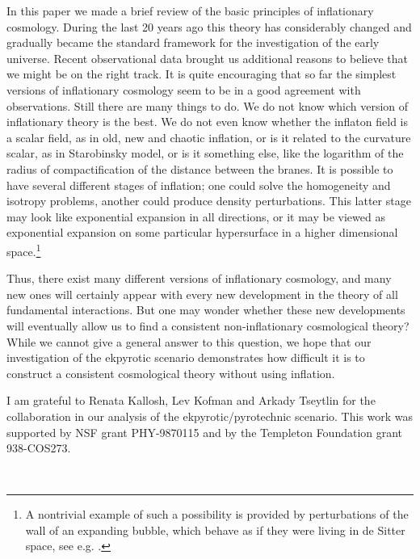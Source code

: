 \documentclass[a4paper,12pt]{article}
\begin{document}
In this paper we made a brief review of the basic principles of inflationary cosmology. During the last 20 years ago this theory has considerably changed and gradually became the standard framework for the investigation of the early universe. Recent observational data brought us additional reasons to believe that we might be on the right track.  It is quite encouraging that so far the simplest versions of inflationary cosmology seem to be in a good agreement with observations. Still there are many things to do. We do not know which  version  of inflationary theory is the best.  We do not even know whether the inflaton field is a scalar field, as in old, new and chaotic inflation, or is it related to the curvature scalar, as in Starobinsky model, or is it something else, like the logarithm of the radius of compactification of the distance between the branes. It is possible to have several different stages of inflation; one could solve the homogeneity and isotropy problems, another could produce density perturbations. This latter stage may look like exponential expansion in all directions, or it may be viewed as exponential expansion on some particular hypersurface in a higher dimensional space.\footnote{A nontrivial example of such a possibility is provided by  perturbations of the wall of an expanding bubble, which behave as if they were living in de Sitter space, see e.g. \cite{VilGarr}.}   

Thus, there exist many different versions of inflationary cosmology, and many new ones will certainly appear with every new development in the theory of all fundamental interactions.  But one may wonder whether these new developments  will eventually allow us to find a consistent non-inflationary cosmological theory?  While we cannot give a general answer to this question, we hope that our investigation of the ekpyrotic scenario demonstrates  how difficult it is to construct a consistent cosmological theory without using inflation.

I am grateful to Renata Kallosh, Lev Kofman and Arkady Tseytlin for the collaboration in our analysis of the ekpyrotic/pyrotechnic scenario. This work was 
supported by NSF grant PHY-9870115 and by the   
Templeton Foundation  grant 938-COS273. 

\
   
\end{document}

